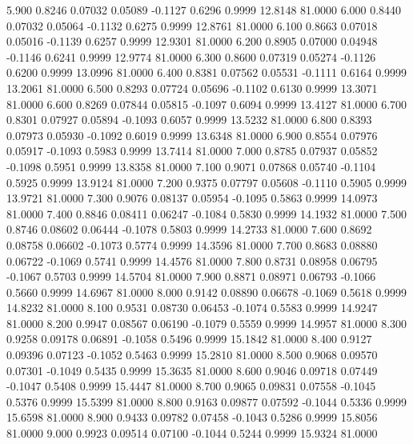    5.900   0.8246   0.07032   0.05089  -0.1127   0.6296   0.9999  12.8148  81.0000
   6.000   0.8440   0.07032   0.05064  -0.1132   0.6275   0.9999  12.8761  81.0000
   6.100   0.8663   0.07018   0.05016  -0.1139   0.6257   0.9999  12.9301  81.0000
   6.200   0.8905   0.07000   0.04948  -0.1146   0.6241   0.9999  12.9774  81.0000
   6.300   0.8600   0.07319   0.05274  -0.1126   0.6200   0.9999  13.0996  81.0000
   6.400   0.8381   0.07562   0.05531  -0.1111   0.6164   0.9999  13.2061  81.0000
   6.500   0.8293   0.07724   0.05696  -0.1102   0.6130   0.9999  13.3071  81.0000
   6.600   0.8269   0.07844   0.05815  -0.1097   0.6094   0.9999  13.4127  81.0000
   6.700   0.8301   0.07927   0.05894  -0.1093   0.6057   0.9999  13.5232  81.0000
   6.800   0.8393   0.07973   0.05930  -0.1092   0.6019   0.9999  13.6348  81.0000
   6.900   0.8554   0.07976   0.05917  -0.1093   0.5983   0.9999  13.7414  81.0000
   7.000   0.8785   0.07937   0.05852  -0.1098   0.5951   0.9999  13.8358  81.0000
   7.100   0.9071   0.07868   0.05740  -0.1104   0.5925   0.9999  13.9124  81.0000
   7.200   0.9375   0.07797   0.05608  -0.1110   0.5905   0.9999  13.9721  81.0000
   7.300   0.9076   0.08137   0.05954  -0.1095   0.5863   0.9999  14.0973  81.0000
   7.400   0.8846   0.08411   0.06247  -0.1084   0.5830   0.9999  14.1932  81.0000
   7.500   0.8746   0.08602   0.06444  -0.1078   0.5803   0.9999  14.2733  81.0000
   7.600   0.8692   0.08758   0.06602  -0.1073   0.5774   0.9999  14.3596  81.0000
   7.700   0.8683   0.08880   0.06722  -0.1069   0.5741   0.9999  14.4576  81.0000
   7.800   0.8731   0.08958   0.06795  -0.1067   0.5703   0.9999  14.5704  81.0000
   7.900   0.8871   0.08971   0.06793  -0.1066   0.5660   0.9999  14.6967  81.0000
   8.000   0.9142   0.08890   0.06678  -0.1069   0.5618   0.9999  14.8232  81.0000
   8.100   0.9531   0.08730   0.06453  -0.1074   0.5583   0.9999  14.9247  81.0000
   8.200   0.9947   0.08567   0.06190  -0.1079   0.5559   0.9999  14.9957  81.0000
   8.300   0.9258   0.09178   0.06891  -0.1058   0.5496   0.9999  15.1842  81.0000
   8.400   0.9127   0.09396   0.07123  -0.1052   0.5463   0.9999  15.2810  81.0000
   8.500   0.9068   0.09570   0.07301  -0.1049   0.5435   0.9999  15.3635  81.0000
   8.600   0.9046   0.09718   0.07449  -0.1047   0.5408   0.9999  15.4447  81.0000
   8.700   0.9065   0.09831   0.07558  -0.1045   0.5376   0.9999  15.5399  81.0000
   8.800   0.9163   0.09877   0.07592  -0.1044   0.5336   0.9999  15.6598  81.0000
   8.900   0.9433   0.09782   0.07458  -0.1043   0.5286   0.9999  15.8056  81.0000
   9.000   0.9923   0.09514   0.07100  -0.1044   0.5244   0.9999  15.9324  81.0000
